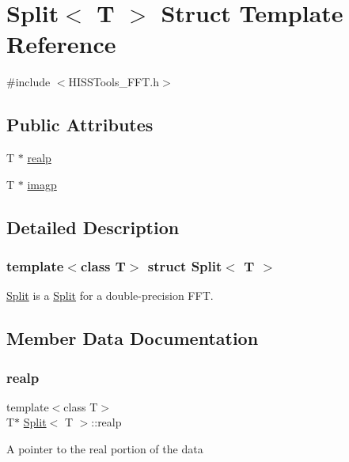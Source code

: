 \hypertarget{struct_split}{}\section{Split$<$ T $>$ Struct Template Reference}
\label{struct_split}


{\ttfamily \#include $<$H\+I\+S\+S\+Tools\+\_\+\+F\+F\+T.\+h$>$}

\subsection*{Public Attributes}
\begin{DoxyCompactItemize}
\item 
T $\ast$ \hyperlink{struct_split_aaadcedfa082d6f07b33cd89ea4f19814}{realp}
\item 
T $\ast$ \hyperlink{struct_split_a21ff23a96abee0c0ed6a2433798c4eac}{imagp}
\end{DoxyCompactItemize}


\subsection{Detailed Description}
\subsubsection*{template$<$class T$>$\newline
struct Split$<$ T $>$}

\hyperlink{struct_split}{Split} is a \hyperlink{struct_split}{Split} for a double-\/precision F\+FT. 

\subsection{Member Data Documentation}
\mbox{\label{struct_split_aaadcedfa082d6f07b33cd89ea4f19814}} 
\subsubsection{\texorpdfstring{realp}{realp}}
{\footnotesize\ttfamily template$<$class T$>$ \\
T$\ast$ \hyperlink{struct_split}{Split}$<$ T $>$\+::realp}

A pointer to the real portion of the data \mbox{\label{struct_split_a21ff23a96abee0c0ed6a2433798c4eac}} 
